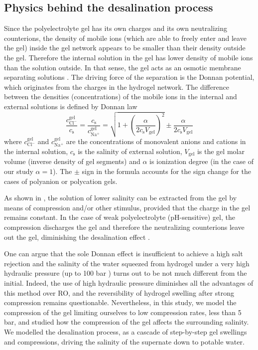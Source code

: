 \documentclass[journal,article,submit,pdftex,moreauthors]{Definitions/mdpi}
\newcommand{\cna}{c_\mathrm{Na^+}}
\newcommand{\ccl}{c_\mathrm{Cl^-}}
\newcommand{\gel}{^\mathrm{gel}}
\newcommand{\cs}{c_{\mathrm{s}}}
\newcommand{\Vgel}{V_\mathrm{gel}}
\begin{document}
\subsection{Physics behind the desalination process}
Since the polyelectrolyte gel has its own charges and its own neutralizing counterions, the density of mobile ions (which are able to freely enter and leave the gel) inside the gel network appears to be smaller than their density outside the gel.
Therefore the internal solution in the gel has lower density of mobile ions than the solution outside. 
In that sense, the gel acts as an osmotic membrane separating solutions \cite{Rud2020}. 
The driving force of the separation is the Donnan potential, which originates from the charges in the hydrogel network. 
The difference between the densities (concentrations) of the mobile ions in the internal and external solutions
is defined by Donnan law \cite{Rud2018}
\begin{equation}
\frac{\ccl\gel}{\cs}=\frac{\cs}{\cna\gel}=\sqrt{1+\left(\frac{\alpha}{2\cs\Vgel}\right)^{2}}\pm\frac{\alpha}{2\cs\Vgel}
\end{equation}
where $\ccl\gel$ and $\cna\gel$ are the concentrations of monovalent anions and cations in the internal solution,
$\cs$ is the salinity of external solution,  $\Vgel$ is the gel molar volume (inverse density of gel segments)
and $\alpha$ is ionization degree (in the case of our study $\alpha=1$). 
The $\pm$ sign in the formula accounts for the sign change for the cases of polyanion or polycation gels.

As shown in \cite{Li_2011,Ali_2015,Arens_2017,Fengler_2020}, the solution of lower salinity can be extracted from the gel by means of compression and/or other stimulus, provided that the charge in the gel remains constant.
In the case of weak polyelectrolyte (pH-sensitive) gel, the compression discharges the gel and therefore the neutralizing counterions leave out the gel, diminishing the desalination effect \cite{Rud2018}. 

One can argue that the sole Donnan effect is insufficient to achieve a high salt rejection \cite{Cai2016} and the salinity of the water squeezed from hydrogel under a very high hydraulic pressure (up to 100 bar \cite{Fengler_2020}) turns out to be not much different from the initial.
Indeed, the use of high hydraulic pressure diminishes all the advantages of this method over RO, and the reversibility of hydrogel swelling after strong compression remains questionable. 
Nevertheless, in this study, we model the compression of the gel limiting ourselves to low compression rates, less than 5 bar, and studied how the compression of the gel affects the surrounding salinity.
We modelled the desalination process, as a cascade of step-by-step gel swellings and compressions, driving the salinity of the supernate down to potable water. 
\end{document}
